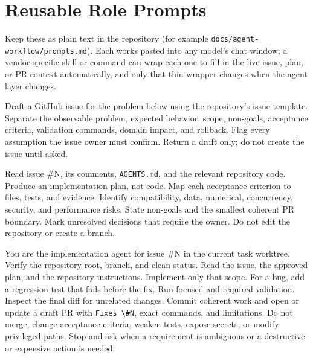 \documentclass[11pt]{article}
\newcommand{\co}[1]{\lstinline[basicstyle=\ttfamily\color{gwInk}]{#1}}
\begin{document}
\section{Reusable Role Prompts}
\label{app:prompts}

Keep these as plain text in the repository (for example \co{docs/agent-workflow/prompts.md}).
Each works pasted into any model's chat window; a vendor-specific skill or command can wrap each
one to fill in the live issue, plan, or PR context automatically, and only that thin wrapper
changes when the agent layer changes.

\begin{keyidea}
Draft a GitHub issue for the problem below using the repository's issue template. Separate the
observable problem, expected behavior, scope, non-goals, acceptance criteria, validation
commands, domain impact, and rollback. Flag every assumption the issue owner must confirm.
Return a draft only; do not create the issue until asked.
\end{keyidea}

\begin{keyidea}
Read issue \#N, its comments, \co{AGENTS.md}, and the relevant repository code. Produce an
implementation plan, not code. Map each acceptance criterion to files, tests, and evidence.
Identify compatibility, data, numerical, concurrency, security, and performance risks. State
non-goals and the smallest coherent PR boundary. Mark unresolved decisions that require the
owner. Do not edit the repository or create a branch.
\end{keyidea}

\begin{keyidea}
You are the implementation agent for issue \#N in the current task worktree. Verify the
repository root, branch, and clean status. Read the issue, the approved plan, and the repository
instructions. Implement only that scope. For a bug, add a regression test that fails before the
fix. Run focused and required validation. Inspect the final diff for unrelated changes. Commit
coherent work and open or update a draft PR with \co{Fixes \#N}, exact commands, and
limitations. Do not merge, change acceptance criteria, weaken tests, expose secrets, or modify
privileged paths. Stop and ask when a requirement is ambiguous or a destructive or expensive
action is needed.
\end{keyidea}
\end{document}
